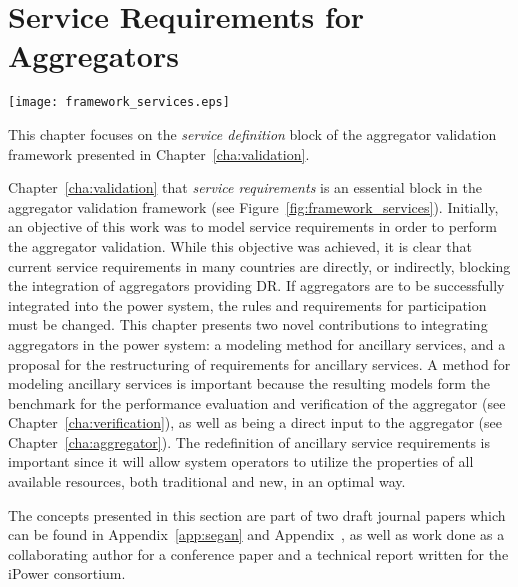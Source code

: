 \chapter{Service Requirements for Aggregators} %
\label{cha:services}
\begin{marginfigure}
	\texttt{[image: framework\_services.eps]}
	\caption{This chapter focuses on the \emph{service definition} block of the aggregator validation framework presented in Chapter~\ref{cha:validation}.}
      \label{fig:framework_services}
\end{marginfigure}
 Chapter~\ref{cha:validation} that \emph{service requirements} is an essential block in the aggregator validation framework (see Figure~\ref{fig:framework_services}). Initially, an objective of this work was to model service requirements in order to perform the aggregator validation. While this objective was achieved, it is clear that current service requirements in many countries are directly, or indirectly, blocking the integration of aggregators providing DR. If aggregators are to be successfully integrated into the power system, the rules and requirements for participation must be changed. This chapter presents two novel contributions to integrating aggregators in the power system: a modeling method for ancillary services, and a proposal for the restructuring of requirements for ancillary services. A method for modeling ancillary services is important because the resulting models form the benchmark for the performance evaluation and verification of the aggregator (see Chapter~\ref{cha:verification}), as well as being a direct input to the aggregator (see Chapter~\ref{cha:aggregator}). The redefinition of ancillary service requirements is important since it will allow system operators to utilize the properties of all available resources, both traditional and new, in an optimal way.

The concepts presented in this section are part of two draft journal papers which can be found in Appendix~\ref{app:segan} and Appendix~, as well as work done as a collaborating author for a conference paper and a technical report written for the iPower consortium.


